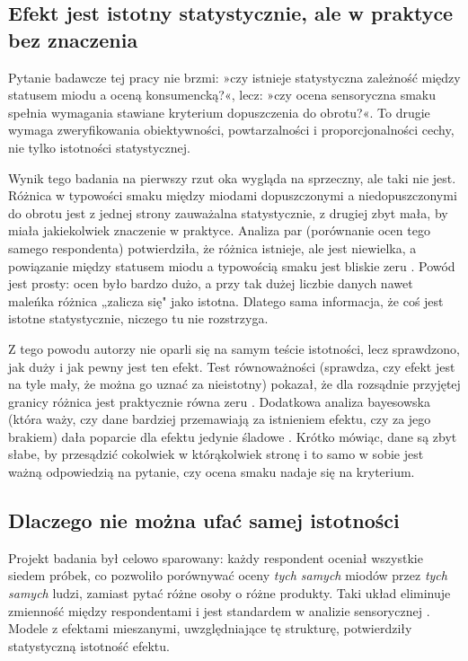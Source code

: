\documentclass[12pt,a4paper]{article}
\begin{document}
\subsection{Efekt jest istotny statystycznie, ale w praktyce bez znaczenia}

Pytanie badawcze tej pracy nie brzmi: »czy istnieje statystyczna zależność
między statusem miodu a oceną konsumencką?«, lecz: »czy ocena sensoryczna
smaku spełnia wymagania stawiane kryterium dopuszczenia do obrotu?«.
To drugie wymaga zweryfikowania obiektywności, powtarzalności i proporcjonalności
cechy, nie tylko istotności statystycznej.

Wynik tego badania na pierwszy rzut oka wygląda na sprzeczny, ale taki nie jest.
Różnica w typowości smaku między miodami dopuszczonymi a niedopuszczonymi do
obrotu jest z jednej strony zauważalna statystycznie, z drugiej zbyt mała, by
miała jakiekolwiek znaczenie w praktyce. Analiza par (porównanie ocen tego samego
respondenta) potwierdziła, że różnica istnieje, ale jest niewielka, a powiązanie
między statusem miodu a typowością smaku jest bliskie zeru \cite{Wilcoxon1945,
Cohen1988}. Powód jest prosty: ocen było bardzo dużo, a przy tak dużej liczbie
danych nawet maleńka różnica „zalicza się" jako istotna. Dlatego sama informacja,
że coś jest istotne statystycznie, niczego tu nie rozstrzyga.

Z tego powodu autorzy nie oparli się na samym teście istotności, lecz sprawdzono,
jak duży i jak pewny jest ten efekt. Test równoważności (sprawdza, czy efekt jest
na tyle mały, że można go uznać za nieistotny) pokazał, że dla rozsądnie
przyjętej granicy różnica jest praktycznie równa zeru \cite{Lakens2017}.
Dodatkowa analiza bayesowska (która waży, czy dane bardziej przemawiają za
istnieniem efektu, czy za jego brakiem) dała poparcie dla efektu jedynie
śladowe \cite{Rouder2009}. Krótko mówiąc, dane są zbyt słabe, by przesądzić
cokolwiek w którąkolwiek stronę i to samo w sobie jest ważną odpowiedzią na
pytanie, czy ocena smaku nadaje się na kryterium.

\subsection{Dlaczego nie można ufać samej istotności}

Projekt badania był celowo sparowany: każdy respondent oceniał wszystkie siedem
próbek, co pozwoliło porównywać oceny \emph{tych samych} miodów przez \emph{tych samych}
ludzi, zamiast pytać różne osoby o różne produkty. Taki układ eliminuje
zmienność między respondentami i jest standardem w analizie sensorycznej
\cite{LiangZeger1986}. Modele z efektami mieszanymi, uwzględniające tę strukturę,
potwierdziły statystyczną istotność efektu.
\end{document}
